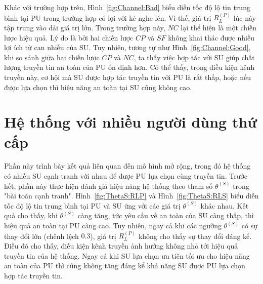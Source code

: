 \documentclass[../main.tex]{subfiles}
\begin{document}
Khác với trường hợp trên, Hình~\ref{fig:Channel:Bad} biểu diễn tốc độ lộ tin trung bình tại PU trong trường hợp có lợi với kẻ nghe lén. Vì thế, giá trị $R_L^{(P)}$ lúc này tập trung vào dải giá trị lớn. Trong trường hợp này, $NC$ lại thể hiện là một chiến lược hiệu quả. Lý do là bởi hai chiến lược $CP$ và $SF$ không khai thác được nhiều lợi ích từ can nhiễu của SU. Tuy nhiên, tương tự như Hình~\ref{fig:Channel:Good}, khi so sánh giữa hai chiến lược $CP$ và $NC$, ta thấy việc hợp tác với SU giúp chất lượng truyền tin an toàn của PU ổn định hơn. Có thể thấy, trong điều kiện kênh truyền này, cơ hội mà SU được hợp tác truyền tin với PU là rất thấp, hoặc nếu được lựa chọn thì hiệu năng an toàn tại SU cũng không cao. 

\section{Hệ thống với nhiều người dùng thứ cấp}

Phần này trình bày kết quả liên quan đến mô hình mở rộng, trong đó hệ thống có nhiều SU cạnh tranh với nhau để được PU lựa chọn cùng truyền tin. Trước hết, phần này thực hiện đánh giá hiệu năng hệ thống theo tham số $\theta^{(S)}$ trong "bài toán cạnh tranh". Hình~\ref{fig:ThetaS:RLP} và Hình~\ref{fig:ThetaS:RLS} biểu diễn tốc độ lộ tin trung bình tại PU và SU ứng với các giá trị $\theta^{(S)}$ khác nhau. Kết quả cho thấy, khi $\theta^{(S)}$ càng tăng, tức yêu cầu về an toàn của SU càng thấp, thì hiệu quả an toàn tại PU càng cao. Tuy nhiên, ngay cả khi các ngưỡng $\theta^{(S)}$ có sự thay đổi lớn (chênh lệch $0.3$), giá trị $R_L^{(P)}$ không cho thấy sự thay đổi đáng kể. Điều đó cho thấy, điều kiện kênh truyền ảnh hưởng không nhỏ tới hiệu quả truyền tin của hệ thống. Ngay cả khi SU lựa chọn ưu tiên tối ưu cho hiệu năng an toàn của PU thì cũng không tăng đáng kể khả năng SU được PU lựa chọn hợp tác truyền tin.
\end{document}
